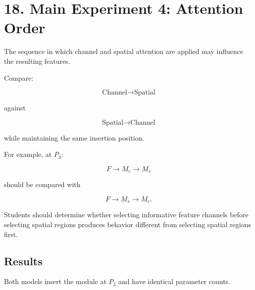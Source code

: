 \documentclass[10pt]{article}
\begin{document}
\section*{18. Main Experiment 4: Attention Order}

The sequence in which channel and spatial attention are applied may influence
the resulting features.

Compare:

\[
\boxed{
\text{Channel}
\rightarrow
\text{Spatial}
}
\]

against

\[
\boxed{
\text{Spatial}
\rightarrow
\text{Channel}
}
\]

while maintaining the same insertion position.

For example, at $P_3$:

\[
F
\rightarrow
M_c
\rightarrow
M_s
\]

should be compared with

\[
F
\rightarrow
M_s
\rightarrow
M_c.
\]

Students should determine whether selecting informative feature channels
before selecting spatial regions produces behavior different from selecting
spatial regions first.


\subsection*{Results}

Both models insert the module at $P_3$ and have identical parameter counts.

\begin{center}
\end{center}
\end{document}
